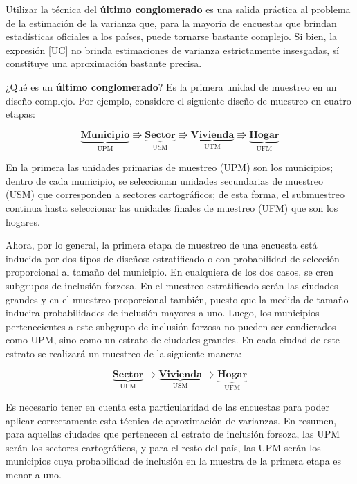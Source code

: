 Utilizar la técnica del \textbf{último conglomerado} es una salida práctica al problema de la estimación de la varianza que, para la mayoría de encuestas que brindan estadísticas oficiales a los países, puede tornarse bastante complejo. Si bien, la expresión \eqref{UC} no brinda estimaciones de varianza estrictamente insesgadas, sí constituye una aproximación bastante precisa.

¿Qué es un \textbf{último conglomerado}? Es la primera unidad de muestreo en un diseño complejo. Por ejemplo, considere el siguiente diseño de muestreo en cuatro etapas:

\begin{equation*}
\underbrace{\textbf{Municipio}}_{\text{UPM}} \Rrightarrow
\underbrace{\textbf{Sector}}_{\text{USM}} \Rrightarrow
\underbrace{\textbf{Vivienda}}_{\text{UTM}} \Rrightarrow
\underbrace{\textbf{Hogar}}_{\text{UFM}}
\end{equation*}

En la primera las unidades primarias de muestreo (UPM) son los municipios; dentro de cada municipio, se seleccionan unidades secundarias de muestreo (USM) que corresponden a sectores cartográficos; de esta forma, el submuestreo continua hasta seleccionar las unidades finales de muestreo (UFM) que son los hogares.

Ahora, por lo general, la primera etapa de muestreo de una encuesta está inducida por dos tipos de diseños: estratificado o con probabilidad de selección proporcional al tamaño del municipio. En cualquiera de los dos casos, se cren subgrupos de inclusión forzosa. En el muestreo estratificado serán las ciudades grandes y en el muestreo proporcional también, puesto que la medida de tamaño inducira probabilidades de inclusión mayores a uno.
Luego, los municipios pertenecientes a este subgrupo de inclusión forzosa no pueden ser condierados como UPM, sino como un estrato de ciudades grandes. En cada ciudad de este estrato se realizará un muestreo de la siguiente manera:

\begin{equation*}
\underbrace{\textbf{Sector}}_{\text{UPM}} \Rrightarrow
\underbrace{\textbf{Vivienda}}_{\text{USM}} \Rrightarrow
\underbrace{\textbf{Hogar}}_{\text{UFM}}
\end{equation*}

Es necesario tener en cuenta esta particularidad de las encuestas para poder aplicar correctamente esta técnica de aproximación de varianzas. En resumen, para aquellas ciudades que pertenecen al estrato de inclusión forsoza, las UPM serán los sectores cartográficos, y para el resto del país, las UPM serán los municipios cuya probabilidad de inclusión en la muestra de la primera etapa es menor a uno.

